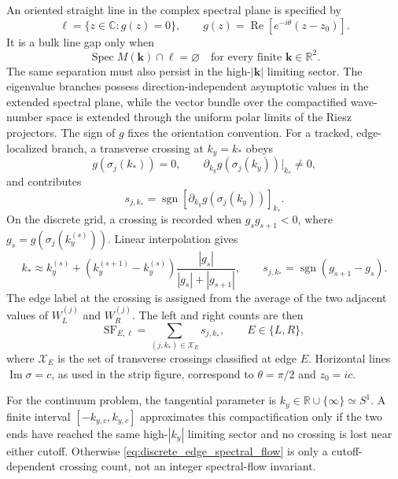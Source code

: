 \documentclass[11pt]{article}
\numberwithin{equation}{section}
\begin{document}
An oriented straight line in the complex spectral plane is specified by
\begin{equation}
  \ell=\{z\in\mathbb C:g(z)=0\},
  \qquad
  g(z)=\operatorname{Re}[e^{-i\theta}(z-z_0)].
  \label{eq:oriented_line_gap}
\end{equation}
It is a bulk line gap only when
\begin{equation}
  \operatorname{Spec}M(\mathbf k)\cap\ell=\varnothing
  \quad\text{for every finite }\mathbf k\in\mathbb R^2.
  \label{eq:bulk_line_gap_condition}
\end{equation}
The same separation must also persist in the high-$|\mathbf k|$ limiting
sector. The eigenvalue branches possess direction-independent asymptotic
values in the extended spectral plane, while the vector bundle over the
compactified wave-number space is extended through the uniform polar limits
of the Riesz projectors.
The sign of $g$ fixes the orientation convention.  For a tracked,
edge-localized branch, a transverse crossing at $k_y=k_*$ obeys
\begin{equation}
  g(\sigma_j(k_*))=0,
  \qquad
  \partial_{k_y}g(\sigma_j(k_y))|_{k_*}\neq0,
\end{equation}
and contributes
\begin{equation}
  s_{j,k_*}=\operatorname{sgn}
  \left[\partial_{k_y}g(\sigma_j(k_y))\right]_{k_*}.
  \label{eq:continuous_crossing_sign}
\end{equation}
On the discrete grid, a crossing is recorded when
$g_sg_{s+1}<0$, where $g_s=g(\sigma_j(k_y^{(s)}))$.  Linear interpolation
gives
\begin{equation}
  k_*\approx k_y^{(s)}+
  (k_y^{(s+1)}-k_y^{(s)})
  \frac{|g_s|}{|g_s|+|g_{s+1}|},
  \qquad
  s_{j,k_*}=\operatorname{sgn}(g_{s+1}-g_s).
  \label{eq:discrete_crossing_rule}
\end{equation}
The edge label at the crossing is assigned from the average of the two
adjacent values of $W_L^{(j)}$ and $W_R^{(j)}$.  The left and right counts
are then
\begin{equation}
  \mathrm{SF}_{E,\ell}
  =\sum_{(j,k_*)\in\mathcal X_E}s_{j,k_*},
  \qquad E\in\{L,R\},
  \label{eq:discrete_edge_spectral_flow}
\end{equation}
where $\mathcal X_E$ is the set of transverse crossings classified at edge
$E$.  Horizontal lines $\operatorname{Im}\sigma=c$, as used in the strip
figure, correspond to $\theta=\pi/2$ and $z_0=ic$.

For the continuum problem, the tangential parameter is
$k_y\in\mathbb R\cup\{\infty\}\simeq S^1$.  A finite interval
$[-k_{y,c},k_{y,c}]$ approximates this compactification only if the two
ends have reached the same high-$|k_y|$ limiting sector and no crossing is
lost near either cutoff.  Otherwise
\eqref{eq:discrete_edge_spectral_flow} is only a cutoff-dependent crossing
count, not an integer spectral-flow invariant.
\end{document}
